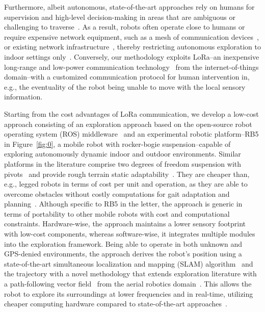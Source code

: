 \documentclass[lettersize,journal]{IEEEtran}
\theoremstyle{definition}
\begin{document}
\IEEEpubidadjcol
Furthermore, albeit autonomous, state-of-the-art approaches rely on humans for supervision and high-level decision-making in areas that are ambiguous or challenging to traverse~\cite{tranzatto2022cerberus,roucek2020darpa,tabib2022autonomous}. 
As a result, robots often operate close to humans or require expensive network equipment, such as a mesh of communication devices~\cite{tranzatto2022cerberus,kulkarni2022autonomous,ebadi2020lamp}, or existing network infrastructure~\cite{khairuldanial2019mobile,baek2022ros,voigtlander20175g}, thereby restricting autonomous exploration to indoor settings only~\cite{delgado2022oros,cadena2016past,eldemiry2022autonomous,corah2019communication,papachristos2017uncertainty}.
Conversely, our methodology exploits LoRa--an inexpensive long-range and low-power communication technology~\cite{shanmuga2020survey} from the internet-of-things domain--with a customized communication protocol 
for human intervention in, e.g., the eventuality of the robot being unable to move with the local sensory information. 

Starting from the cost advantages of LoRa communication, we develop a low-cost approach consisting of an exploration approach based on the open-source robot operating system (ROS) middleware~\cite{quigley2009ros} and an experimental robotic platform--RB5 in Figure~\ref{fig:0}, a mobile robot with rocker-bogie suspension--capable of exploring autonomously dynamic indoor and outdoor environments.
Similar platforms in the literature comprise two degrees of freedom suspension with pivots~\cite{setterfield2013terrain,mann2005dynamic,faisal2021low} and provide rough terrain static adaptability~\cite{kim2012optimal}. They are cheaper than, e.g., legged robots in terms of cost per unit and operation, as they are able to overcome obstacles without costly computations for gait adaptation and planning~\cite{muller2021openbot}.
Although specific to RB5 in the letter, the approach is generic in terms of portability to other mobile robots with cost and computational constraints.
%
Hardware-wise, the approach maintains a lower sensory footprint with low-cost components, whereas 
software-wise, it integrates multiple modules into the exploration framework. Being able to operate in both unknown and GPS-denied environments, the approach derives the robot's position using a state-of-the-art simultaneous localization and mapping (SLAM) algorithm~\cite{labbe2019rtab} %
and the trajectory with a novel methodology that extends exploration literature with a path-following vector field~\cite{goncalves2010vector} from the aerial robotics domain~\cite{seewald2022energy,garcia2017guidance,seewaldphdthesis}. This allows the robot to explore its surroundings at lower frequencies and in real-time, utilizing cheaper computing hardware compared to state-of-the-art approaches~\cite{placed2022survey,tabib2022autonomous,ebadi2020lamp,dang2019graph}. 
\end{document}
